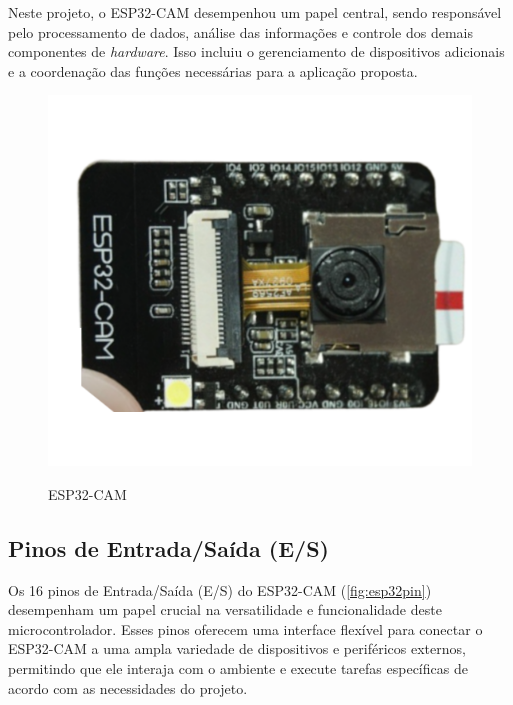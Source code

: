 Neste projeto, o ESP32-CAM desempenhou um papel central, sendo
responsável pelo processamento de dados, análise das informações
e controle dos demais componentes de \textit{hardware}. Isso incluiu
o gerenciamento de dispositivos adicionais e a coordenação das funções
necessárias para a aplicação proposta.

\begin{figure}[h!]
    \centering
    \caption{ESP32-CAM}
    \includegraphics[scale=0.25]{figuras/esp32cam.png}
    \label{fig:espcam}
    \centering
\end{figure}

\subsection{Pinos de Entrada/Saída (E/S)}\label{sec:gpio}

Os 16 pinos de Entrada/Saída (E/S) do ESP32-CAM (\autoref{fig:esp32pin})
desempenham um papel crucial na versatilidade
e funcionalidade deste microcontrolador.
Esses pinos oferecem uma interface flexível para conectar o
ESP32-CAM a uma ampla variedade de dispositivos e periféricos
externos, permitindo que ele interaja com o ambiente e execute
tarefas específicas de acordo com as necessidades do projeto.

